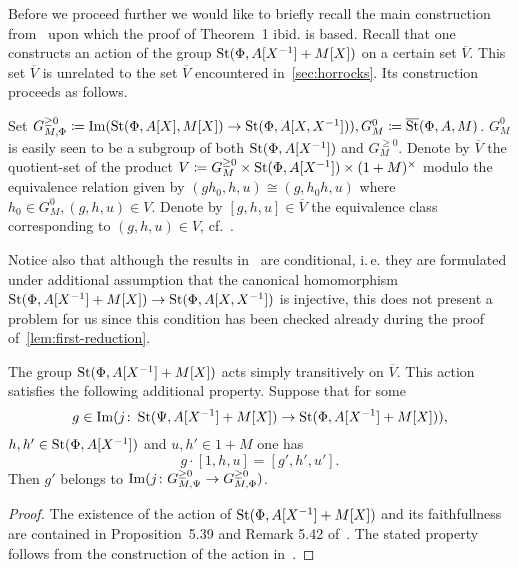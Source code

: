 Before we proceed further we would like to briefly recall the main construction from~\cite{LS20} upon which
 the proof of Theorem~1 ibid. is based.
Recall that one constructs an action of the group $\operatorname{St}(\Phi, A[X^{-1}] + M[X])$ on a certain set $\overline{V}$.
This set $\overline{V}$ is unrelated to the set $\overline{V}$ encountered in~\cref{sec:horrocks}.
Its construction proceeds as follows.

Set $G_{M, \Phi}^{\geq 0} \coloneqq \operatorname{Im}(\operatorname{St}(\Phi, A[X], M[X]) \to \operatorname{St}(\Phi, A[X, X^{-1}])), G_M^0 \coloneqq \overline{\operatorname{St}}(\Phi, A, M)$.
$G_M^0$ is easily seen to be a subgroup of both $\operatorname{St}(\Phi, A[X^{-1}])$ and $G_M^{\geq 0}$.
Denote by $\overline{V}$ the quotient-set of the product $V \coloneqq G_M^{\geq 0} \times \operatorname{St}(\Phi, A[X^{-1}]) \times (1 + M)^\times$
modulo the equivalence relation given by $(gh_0, h, u) \cong (g, h_0h, u)$ where $h_0 \in G_M^0, (g, h, u) \in V.$
Denote by $[g, h, u] \in \overline{V}$ the equivalence class corresponding to $(g, h, u)\in V$, cf.~\cite[\S~5.4]{LS20}.

Notice also that although the results in~\cite[\S~5.5]{LS20} are conditional,
 i.\,e. they are formulated under additional assumption that the canonical homomorphism
 $\operatorname{St}(\Phi, A[X^{-1}] + M[X]) \to \operatorname{St}(\Phi, A[X, X^{-1}])$ is injective,
this does not present a problem for us since this condition has been checked already during the proof of~\cref{lem:first-reduction}.

\begin{prop} \label{prop:horrocks-main} The group $\operatorname{St}(\Phi, A[X^{-1}] + M[X])$ acts simply transitively on $\overline{V}$.
This action satisfies the following additional property.
Suppose that for some
\[g \in \operatorname{Im}(j\colon \operatorname{St}(\Psi, A[X^{-1}] + M[X]) \to \operatorname{St}(\Phi, A[X^{-1}] + M[X])), \]
$h, h' \in \operatorname{St}(\Phi, A[X^{-1}])$ and $u, h' \in 1 + M$ one has
\[ g \cdot [1, h, u] = [g', h', u'].\]
Then $g'$ belongs to $\operatorname{Im}(j\colon G_{M, \Psi}^{\geq 0} \to G_{M, \Phi}^{\geq 0})$.
\end{prop}
\begin{proof}
    The existence of the action of $\operatorname{St}(\Phi, A[X^{-1}] + M[X])$ and its faithfullness are contained in
    Proposition~5.39 and Remark 5.42 of~\cite{LS20}.
    The stated property follows from the construction of the action in~\cite[\S~5.4]{LS20}.
\end{proof}

